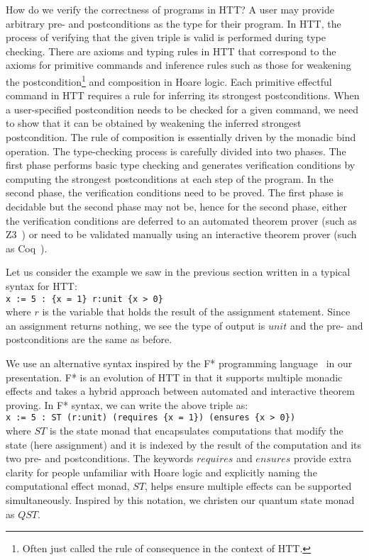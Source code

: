 How do we verify the correctness of programs in HTT? A user may provide arbitrary pre- and postconditions as the type for their program. In HTT, the process of verifying that the given triple is valid is performed during type checking. There are axioms and typing rules in HTT that correspond to the axioms for primitive commands and inference rules such as those for weakening the postcondition\footnote{Often just called the rule of consequence in the context of HTT.} and composition in Hoare logic. Each primitive effectful command in HTT requires a rule for inferring its strongest postconditions. When a user-specified postcondition needs to be checked for a given command, we need to show that it can be obtained by weakening the inferred strongest postcondition. The rule of composition is essentially driven by the monadic bind operation. The type-checking process is carefully divided into two phases. The first phase performs basic type checking and generates verification conditions by computing the strongest postconditions at each step of the program. In the second phase, the verification conditions need to be proved. The first phase is decidable but the second phase may not be, hence for the second phase, either the verification conditions are deferred to an automated theorem prover (such as Z3~\parencite{z32008}) or need to be validated manually using an interactive theorem prover (such as Coq~\parencite{coq2020}).

Let us consider the example we saw in the previous section written in a typical syntax for HTT:\medskip\\
\indent\indent\lstinline[language=QHaskell]!x := 5 : {x = 1} r:unit {x > 0}!
\medskip\\where $r$ is the variable that holds the result of the assignment statement. Since an assignment returns nothing, we see the type of output is $unit$ and the pre- and postconditions are the same as before.

We use an alternative syntax inspired by the F* programming language~\parencite{fstar} in our presentation. F* is an evolution of HTT in that it supports multiple monadic effects and takes a hybrid approach between automated and interactive theorem proving. In F* syntax, we can write the above triple as:\medskip\\
\indent\indent\lstinline[language=QHaskell]!x := 5 : ST (r:unit) (requires {x = 1}) (ensures {x > 0})!
\medskip\\where $ST$ is the state monad that encapsulates computations that modify the state (here assignment) and it is indexed by the result of the computation and its two pre- and postconditions. The keywords $requires$ and $ensures$ provide extra clarity for people unfamiliar with Hoare logic and explicitly naming the computational effect monad, $ST$, helps ensure multiple effects can be supported simultaneously. Inspired by this notation, we christen our quantum state monad as $QST$.

